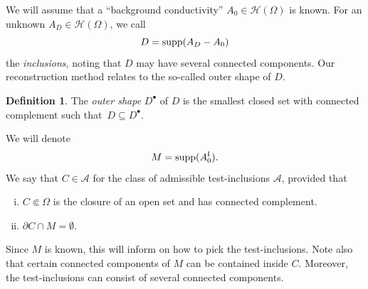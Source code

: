 \documentclass[reqno]{amsart}
\numberwithin{equation}{section}
\numberwithin{figure}{section}
\numberwithin{table}{section}
\theoremstyle{plain}
\theoremstyle{definition}
\newtheorem{definition}[theorem]{Definition}
\theoremstyle{remark}
\newcommand{\suppm}{\mathop{\textup{supp}}}
\newcommand{\upI}{^{\textup{I}}}
\newcommand{\AI}{A\upI}
\begin{document}
	We will assume that a ``background conductivity'' $A_0\in\mathcal{H}(\Omega)$ is known. For an unknown $A_D\in \mathcal{H}(\Omega)$, we call 
	\begin{equation*}
		D = \suppm(A_D - A_0)
	\end{equation*}
	the \emph{inclusions}, noting that $D$ may have several connected components. Our reconstruction method relates to the so-called outer shape of $D$.
	\begin{definition} \label{def:outershape}
		The \emph{outer shape} $D^\bullet$ of $D$ is the smallest closed set with connected complement such that~$D\subseteq D^\bullet$. 
	\end{definition}
	We will denote 
	\begin{equation*}
		M = \suppm(\AI_0).
	\end{equation*}
	We say that $C\in\mathcal{A}$ for the class of admissible test-inclusions $\mathcal{A}$, provided that
	\begin{enumerate}[(i)]
		\item $C\Subset \Omega$ is the closure of an open set and has connected complement.
		\item $\partial C\cap M = \emptyset$.
	\end{enumerate}
	Since $M$ is known, this will inform on how to pick the test-inclusions. Note also that certain connected components of $M$ can be contained inside $C$. Moreover, the test-inclusions can consist of several connected components.
	
\end{document}
